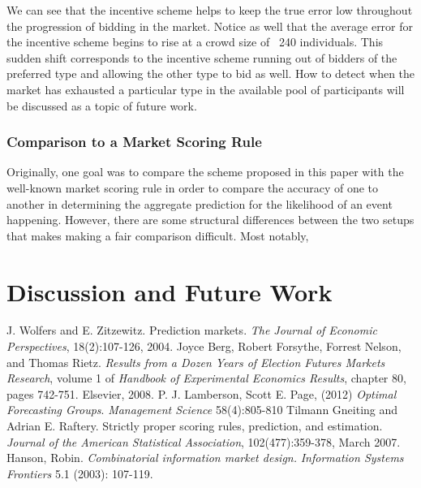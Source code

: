 \documentclass[twoside,twocolumn]{article}
\begin{document}
We can see that the incentive scheme helps to keep the true error low throughout the progression of bidding in the market. Notice as well that the average error for the incentive scheme begins to rise at a crowd size of ~240 individuals. This sudden shift corresponds to the incentive scheme running out of bidders of the preferred type and allowing the other type to bid as well. How to detect when the market has exhausted a particular type in the available pool of participants will be discussed as a topic of future work.

\subsubsection{Comparison to a Market Scoring Rule}

Originally, one goal was to compare the scheme proposed in this paper with the well-known market scoring rule \cite{5} in order to compare the accuracy of one to another in determining the aggregate prediction for the likelihood of an event happening. However, there are some structural differences between the two setups that makes making a fair comparison difficult. Most notably, 

\section{Discussion and Future Work}





\begin{thebibliography}{99} %

J. Wolfers and E. Zitzewitz. Prediction markets. \textit{The Journal of Economic Perspectives},
18(2):107-126, 2004.
 Joyce Berg, Robert Forsythe, Forrest Nelson, and Thomas Rietz. \textit{Results from
a Dozen Years of Election Futures Markets Research}, volume 1 of \textit{Handbook of
Experimental Economics Results}, chapter 80, pages 742-751. Elsevier, 2008.
P. J. Lamberson, Scott E. Page, (2012) \textit{Optimal Forecasting Groups}. \textit{Management Science} 58(4):805-810
Tilmann Gneiting and Adrian E. Raftery. Strictly proper scoring rules, prediction,
and estimation. \textit{Journal of the American Statistical Association}, 102(477):359-378,
March 2007.
Hanson, Robin. \textit{Combinatorial information market design.} \textit{Information Systems Frontiers} 5.1 (2003): 107-119.

 
\end{thebibliography}

\end{document}

